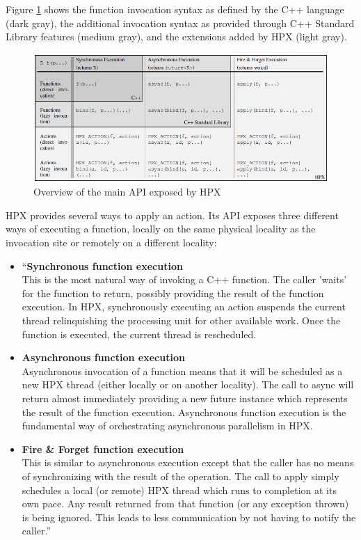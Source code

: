 Figure \ref{fig:hpx-api} shows the function invocation syntax as defined by the C++ language (dark gray), the additional invocation syntax as provided through C++ Standard Library features (medium gray), and the extensions added by HPX (light gray)\cite{kaiser2014hpx}.

\begin{figure}[ht]
\centering
\includegraphics[scale=0.72]{images/hpx_the_api.png}
\caption[Overview of the main API exposed by HPX]{Overview of the main API exposed by HPX}
\label{fig:hpx-api}
\end{figure}

HPX provides several ways to apply an action. Its API exposes three different ways of executing a function, locally on the same physical locality as the invocation site or remotely on a different locality:

\begin{itemize}
\item ``\textbf{Synchronous function execution}\\
  This is the most natural way of invoking a C++ function. The caller ’waits’ for the function to return, possibly providing the result of the function execution. In HPX, synchronously executing an action suspends the current thread relinquishing the processing unit for other available work. Once the function is executed, the current thread is rescheduled.

\item \textbf{Asynchronous function execution}\\
  Asynchronous invocation of a function means that it will be scheduled as a new HPX thread (either locally or on another locality). The call to async will return almost immediately providing a new future instance which represents the result of the function execution. Asynchronous function execution is the fundamental way of orchestrating asynchronous parallelism in HPX.

\item \textbf{Fire \& Forget function execution}\\
  This is similar to asynchronous execution except that the caller has no means of synchronizing with the result of the operation. The call to apply simply schedules a local (or remote) HPX thread which runs to completion at its own pace. Any result returned from that function (or any exception thrown) is being ignored. This leads to less communication by not having to notify the caller.''\cite{kaiser2014hpx}
\end{itemize}


